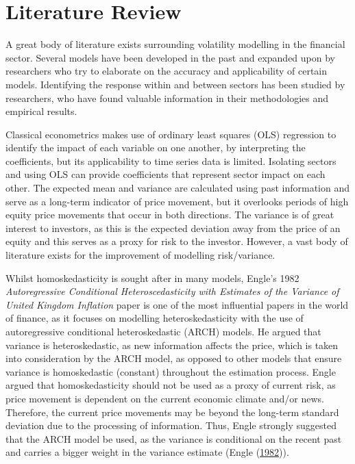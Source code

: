\documentclass[11pt,preprint, authoryear]{elsarticle}
\numberwithin{equation}{section}
\numberwithin{figure}{section}
\numberwithin{table}{section}
\begin{document}
\hypertarget{literature-review}{%
\section{Literature Review}\label{literature-review}}

A great body of literature exists surrounding volatility modelling in
the financial sector. Several models have been developed in the past and
expanded upon by researchers who try to elaborate on the accuracy and
applicability of certain models. Identifying the response within and
between sectors has been studied by researchers, who have found valuable
information in their methodologies and empirical results.

Classical econometrics makes use of ordinary least squares (OLS)
regression to identify the impact of each variable on one another, by
interpreting the coefficients, but its applicability to time series data
is limited. Isolating sectors and using OLS can provide coefficients
that represent sector impact on each other. The expected mean and
variance are calculated using past information and serve as a long-term
indicator of price movement, but it overlooks periods of high equity
price movements that occur in both directions. The variance is of great
interest to investors, as this is the expected deviation away from the
price of an equity and this serves as a proxy for risk to the investor.
However, a vast body of literature exists for the improvement of
modelling risk/variance.

Whilst homoskedasticity is sought after in many models, Engle's 1982
\emph{Autoregressive Conditional Heteroscedasticity with Estimates of
the Variance of United Kingdom Inflation} paper is one of the most
influential papers in the world of finance, as it focuses on modelling
heteroskedasticity with the use of autoregressive conditional
heteroskedastic (ARCH) models. He argued that variance is
heteroskedastic, as new information affects the price, which is taken
into consideration by the ARCH model, as opposed to other models that
ensure variance is homoskedastic (constant) throughout the estimation
process. Engle argued that homoskedasticity should not be used as a
proxy of current risk, as price movement is dependent on the current
economic climate and/or news. Therefore, the current price movements may
be beyond the long-term standard deviation due to the processing of
information. Thus, Engle strongly suggested that the ARCH model be used,
as the variance is conditional on the recent past and carries a bigger
weight in the variance estimate (Engle
(\protect\hyperlink{ref-EngleRobertF.1982ACHw}{1982})).
\end{document}
